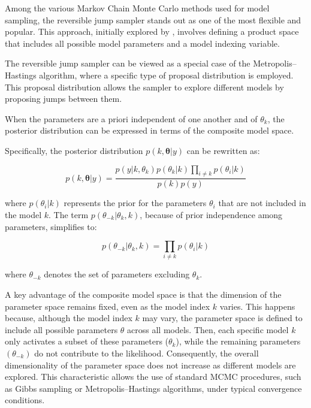 \documentclass{report}
\begin{document}
Among the various Markov Chain Monte Carlo methods used for model sampling, the reversible jump sampler stands out as one of the most flexible and popular. This approach, initially explored by \citet{carlin1995bayesian}, involves defining a product space that includes all possible model parameters and a model indexing variable. 

The reversible jump sampler can be viewed as a special case of the Metropolis–Hastings algorithm, where a specific type of proposal distribution is employed. This proposal distribution allows the sampler to explore different models by proposing jumps between them. 

When the parameters are a priori independent of one another and of $\theta_k$, the posterior distribution can be expressed in terms of the composite model space.

Specifically, the posterior distribution $p(k,\mathbf{\theta}|y)$ can be rewritten as:

\begin{equation}
	p(k, \mathbf{\theta} |y) = \frac{p(y|k,\theta_k) p(\theta_k|k) \prod_{i \neq k} p(\theta_i | k)}{p(k)p(y)}
\end{equation}

where $p(\theta_i|k)$ represents the prior for the parameters $\theta_i$ that are not included in the model $k$. The term $p(\theta_{-k}|\theta_k,k)$, because of prior independence among parameters, simplifies to:

\begin{equation}
	p(\theta_{-k}|\theta_k,k) =\prod_{i \neq k} p(\theta_i | k)
\end{equation}

where $\theta_{-k}$ denotes the set of parameters excluding $\theta_k$.

A key advantage of the composite model space is that the dimension of the parameter space remains fixed, even as the model index $k$ varies. This happens because, although the model index $k$ may vary, the parameter space is defined to include all possible parameters $\theta$ across all models. Then, each specific model $k$ only activates a subset of these parameters ($\theta_k$), while the remaining parameters $(\theta_{-k})$ do not contribute to the likelihood. Consequently, the overall dimensionality of the parameter space does not increase as different models are explored.
This characteristic allows the use of standard MCMC procedures, such as Gibbs sampling or Metropolis–Hastings algorithms, under typical convergence conditions. 
\end{document}
